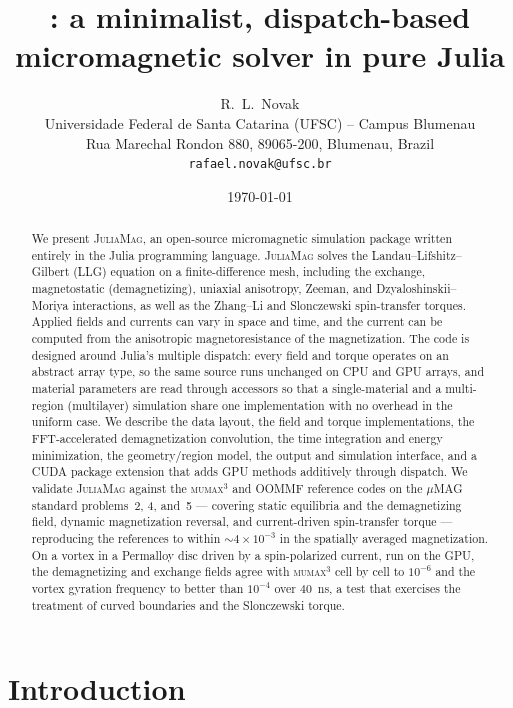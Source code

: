 \documentclass{article}      %
\title{\JuliaMag: a minimalist, dispatch-based micromagnetic solver in pure Julia}
\author{%
  R.~L.~Novak \\
  Universidade Federal de Santa Catarina (UFSC) -- Campus Blumenau \\
  Rua Marechal Rondon 880, 89065-200, Blumenau, Brazil \\
  \texttt{rafael.novak@ufsc.br}
}
\date{\today}
\newcommand{\JuliaMag}{\textsc{JuliaMag}}
\newcommand{\mumax}{\textsc{mumax}$^3$}
\newcommand{\oommf}{\textsc{OOMMF}}
\begin{document}
\maketitle

\begin{abstract}
We present \JuliaMag, an open-source micromagnetic simulation package written
entirely in the Julia programming language. \JuliaMag{} solves the
Landau--Lifshitz--Gilbert (LLG) equation on a finite-difference mesh, including
the exchange, magnetostatic (demagnetizing), uniaxial anisotropy, Zeeman, and
Dzyaloshinskii--Moriya interactions, as well as the Zhang--Li and Slonczewski
spin-transfer torques. Applied fields and currents can vary in space and time, and
the current can be computed from the anisotropic magnetoresistance of the
magnetization. The code is designed around Julia's multiple dispatch:
every field and torque operates on an abstract array type, so the same source
runs unchanged on CPU and GPU arrays, and material parameters are read through
accessors so that a single-material and a multi-region (multilayer) simulation
share one implementation with no overhead in the uniform case. We describe the
data layout, the field and torque implementations, the FFT-accelerated
demagnetization convolution, the time integration and energy minimization, the
geometry/region model, the output and simulation interface, and a CUDA package
extension that adds GPU methods additively through dispatch. We validate
\JuliaMag{} against the \mumax{} and \oommf{} reference codes on the $\mu$MAG
standard problems~2, 4, and~5 --- covering static equilibria and the
demagnetizing field, dynamic magnetization reversal, and current-driven
spin-transfer torque --- reproducing the references to within
$\sim 4\times10^{-3}$ in the spatially averaged magnetization. On a vortex in a
Permalloy disc driven by a spin-polarized current, run on the GPU, the
demagnetizing and exchange fields agree with \mumax{} cell by cell to
$10^{-6}$ and the vortex gyration frequency to better than $10^{-4}$ over
$40$~ns, a test that exercises the treatment of curved boundaries and the
Slonczewski torque.
\end{abstract}


\section{Introduction}
\label{sec:intro}
\end{document}
